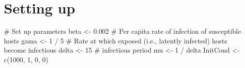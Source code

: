 \documentclass[
  letterpaper,
  DIV=11,
  numbers=noendperiod]{scrreprt}
\newenvironment{Shaded}{\begin{snugshade}}{\end{snugshade}}
\newcommand{\CommentTok}[1]{\textcolor[rgb]{0.37,0.37,0.37}{#1}}
\newcommand{\ControlFlowTok}[1]{\textcolor[rgb]{0.00,0.23,0.31}{#1}}
\newcommand{\DecValTok}[1]{\textcolor[rgb]{0.68,0.00,0.00}{#1}}
\newcommand{\FloatTok}[1]{\textcolor[rgb]{0.68,0.00,0.00}{#1}}
\newcommand{\FunctionTok}[1]{\textcolor[rgb]{0.28,0.35,0.67}{#1}}
\newcommand{\NormalTok}[1]{\textcolor[rgb]{0.00,0.23,0.31}{#1}}
\newcommand{\OtherTok}[1]{\textcolor[rgb]{0.00,0.23,0.31}{#1}}
\newcommand{\SpecialCharTok}[1]{\textcolor[rgb]{0.37,0.37,0.37}{#1}}
\begin{document}
\begin{Shaded}
\end{Shaded}

\hypertarget{setting-up}{%
\section{Setting up}\label{setting-up}}

\begin{Shaded}
\begin{Highlighting}[]
\CommentTok{\# Set up parameters}
\NormalTok{beta }\OtherTok{\textless{}{-}} \FloatTok{0.002} \CommentTok{\# Per capita rate of infection of susceptible hosts}
\NormalTok{gama }\OtherTok{\textless{}{-}} \DecValTok{1} \SpecialCharTok{/} \DecValTok{5} \CommentTok{\#  Rate at which exposed (i.e., latently infected) hosts become infectious}
\NormalTok{delta }\OtherTok{\textless{}{-}} \DecValTok{15} \CommentTok{\# infectious period}
\NormalTok{mu }\OtherTok{\textless{}{-}} \DecValTok{1} \SpecialCharTok{/}\NormalTok{ delta}
\NormalTok{InitCond }\OtherTok{\textless{}{-}} \FunctionTok{c}\NormalTok{(}\DecValTok{1000}\NormalTok{, }\DecValTok{1}\NormalTok{, }\DecValTok{0}\NormalTok{, }\DecValTok{0}\NormalTok{)}
\end{Highlighting}
\end{Shaded}
\end{document}

